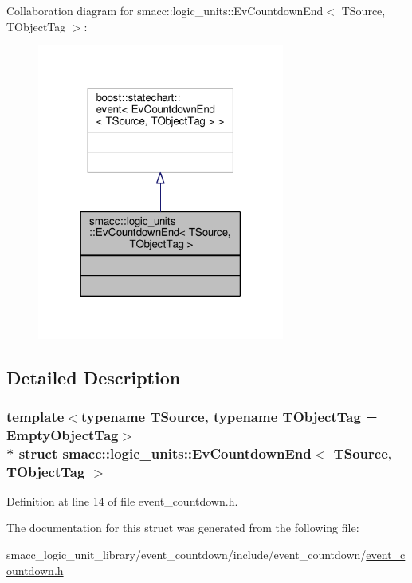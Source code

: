 Collaboration diagram for smacc\+:\+:logic\+\_\+units\+:\+:Ev\+Countdown\+End$<$ T\+Source, T\+Object\+Tag $>$\+:\nopagebreak
\begin{figure}[H]
\begin{center}
\leavevmode
\includegraphics[width=230pt]{structsmacc_1_1logic__units_1_1EvCountdownEnd__coll__graph}
\end{center}
\end{figure}


\subsection{Detailed Description}
\subsubsection*{template$<$typename T\+Source, typename T\+Object\+Tag = Empty\+Object\+Tag$>$\\*
struct smacc\+::logic\+\_\+units\+::\+Ev\+Countdown\+End$<$ T\+Source, T\+Object\+Tag $>$}



Definition at line 14 of file event\+\_\+countdown.\+h.



The documentation for this struct was generated from the following file\+:\begin{DoxyCompactItemize}
\item 
smacc\+\_\+logic\+\_\+unit\+\_\+library/event\+\_\+countdown/include/event\+\_\+countdown/\hyperlink{event__countdown_8h}{event\+\_\+countdown.\+h}\end{DoxyCompactItemize}
